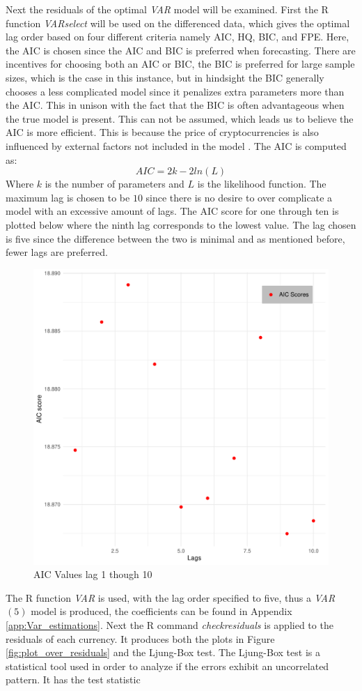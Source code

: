 \noindent Next the residuals of the optimal \textit{VAR} model will be examined. First the R function \textit{VARselect} will be used on the differenced data, which gives the optimal lag order based on four different criteria namely AIC, HQ, BIC, and FPE. 
Here, the AIC is chosen since the AIC and BIC is preferred when forecasting. There are incentives for choosing both an AIC or BIC, the BIC is preferred for large sample sizes, which is the case in this instance, but in hindsight the BIC generally chooses a less complicated model since it penalizes extra parameters more than the AIC. This in unison with the fact that the BIC is often advantageous when the true model is present. This can not be assumed, which leads us to believe the AIC is more efficient. This is because the price of cryptocurrencies is also influenced by external factors not included in the model \cite{AICorBIC}. The AIC is computed as:
\begin{equation*}
    AIC=2k-2ln(L)
\end{equation*}
Where $k$ is the number of parameters and $L$ is the likelihood function.
The maximum lag is chosen to be $10$ since there is no desire to over complicate a model with an excessive amount of lags. The AIC score for one through ten is plotted below where the ninth lag corresponds to the lowest value. The lag chosen is five since the difference between the two is minimal and as mentioned before, fewer lags are preferred.
\begin{figure}[H]
    \centering
    \includegraphics[width=0.5\linewidth]{1.Projekt_kode/Billeder/Crypto_lags.pdf}
    \caption{AIC Values lag 1 though 10}
    \label{fig:enter-label}
\end{figure}
\noindent The R function \textit{VAR} is used, with the lag order specified to five, thus a \textit{VAR}$(5)$ model is produced, the coefficients can be found in Appendix \ref{app:Var_estimations}. Next the R command \textit{checkresiduals} is applied to the residuals of each currency. It produces both the plots in Figure \ref{fig:plot_over_residuals} and the Ljung-Box test. The Ljung-Box test is a statistical tool used in order to analyze if the errors exhibit an uncorrelated pattern. It has the test statistic 
